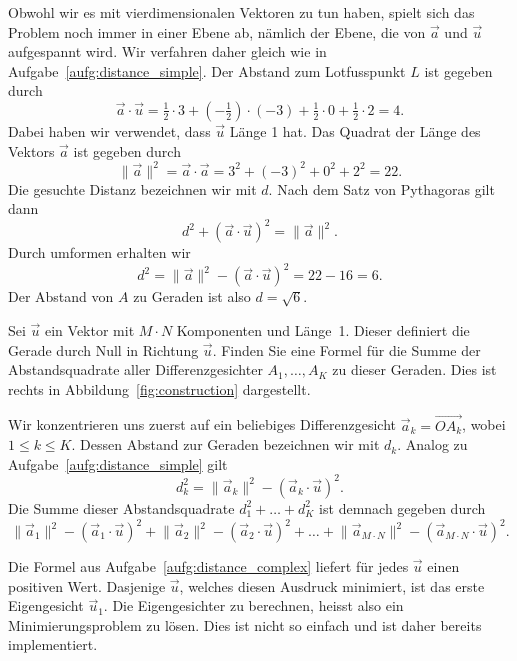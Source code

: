 \begin{losung}
	Obwohl wir es mit vierdimensionalen Vektoren zu tun haben, spielt sich das Problem noch immer in einer Ebene ab, nämlich der Ebene, die von $\vec a$ und $\vec u$ aufgespannt wird.
	Wir verfahren daher gleich wie in Aufgabe~\ref{aufg:distance_simple}.
	Der Abstand zum Lotfusspunkt $L$ ist gegeben durch
	\begin{equation*}
		\vec{a}\cdot\vec{u}=\tfrac{1}{2}\cdot 3+\left(-\tfrac{1}{2}\right)\cdot\left(-3\right)+\tfrac{1}{2}\cdot 0+\tfrac{1}{2}\cdot 2=4.
	\end{equation*}
	Dabei haben wir verwendet, dass $\vec{u}$ Länge 1 hat.
	Das Quadrat der Länge des Vektors $\vec a$ ist gegeben durch
	\begin{equation*}
		\lVert\vec{a}\rVert^2=\vec{a}\cdot\vec{a}=3^2+\left(-3\right)^2+0^2+2^2=22.
	\end{equation*}
	Die gesuchte Distanz bezeichnen wir mit $d$.
	Nach dem Satz von Pythagoras gilt dann
	\begin{equation*}
		d^2+\left(\vec{a}\cdot\vec{u}\right)^2=\lVert\vec{a}\rVert^2.
	\end{equation*}
	Durch umformen erhalten wir
	\begin{equation*}
		d^2=\lVert\vec{a}\rVert^2-\left(\vec{a}\cdot\vec{u}\right)^2=22-16=6.
	\end{equation*}
	Der Abstand von $A$ zu Geraden ist also $d=\sqrt{6}$.
\end{losung}
\begin{aufgabe} \label{aufg:distance_complex}
	Sei $\vec{u}$ ein Vektor mit $M\cdot N$ Komponenten und Länge~1.
	Dieser definiert die Gerade durch Null in Richtung $\vec{u}$.
	Finden Sie eine Formel für die Summe der Abstandsquadrate aller Differenzgesichter $A_1,\ldots,A_K$ zu dieser Geraden.
	Dies ist rechts in Abbildung~\ref{fig:construction} dargestellt.
\end{aufgabe}
\begin{losung}
	Wir konzentrieren uns zuerst auf ein beliebiges Differenzgesicht $\vec{a}_k=\overrightarrow{OA_k}$, wobei $1\leq k\leq K$.
	Dessen Abstand zur Geraden bezeichnen wir mit $d_k$.
	Analog zu Aufgabe~\ref{aufg:distance_simple} gilt
	\begin{equation*}
		d_k^2=\lVert\vec{a}_k\rVert^2-\left(\vec{a}_k\cdot\vec{u}\right)^2.
	\end{equation*}
	Die Summe dieser Abstandsquadrate $d_1^2+\ldots+d_K^2$ ist demnach gegeben durch
	\begin{equation*}
		\lVert\vec{a}_1\rVert^2-\left(\vec{a}_1\cdot\vec{u}\right)^2
		+\lVert\vec{a}_2\rVert^2-\left(\vec{a}_2\cdot\vec{u}\right)^2
		+\ldots+
		\lVert\vec{a}_{M\cdot N}\rVert^2-\left(\vec{a}_{M\cdot N}\cdot\vec{u}\right)^2.
	\end{equation*}
\end{losung}
Die Formel aus Aufgabe~\ref{aufg:distance_complex} liefert für jedes $\vec{u}$ einen positiven Wert.
Dasjenige $\vec{u}$, welches diesen Ausdruck minimiert, ist das erste Eigengesicht $\vec{u}_1$.
Die Eigengesichter zu berechnen, heisst also ein Minimierungsproblem zu lösen.
Dies ist nicht so einfach und ist daher bereits implementiert.

